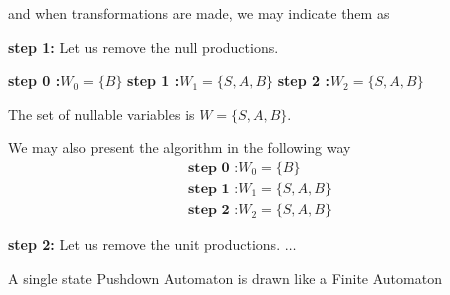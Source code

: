 \documentclass[a4 paper]{article}
\begin{document}
\noindent and when transformations are made, we may indicate them as

\noindent \textbf{step 1: } Let us remove the null productions. 

\begin{center}
\begin{algorithmic}
\STATE \textbf{step 0 :}$W_0=\lbrace B\rbrace$
\STATE  \textbf{step 1 :}$W_1=\lbrace S, A, B\rbrace$
\STATE  \textbf{step 2 :}$W_2=\lbrace S, A, B\rbrace$
\end{algorithmic}
\end{center} 
\noindent The set of nullable variables is $W=\lbrace S, A, B\rbrace$.

We may also present the algorithm in the following way 
\begin{equation*}
    \begin{array}{l}
         \textbf{step 0 :}W_0=\lbrace B\rbrace  \\
         \textbf{step 1 :}W_1=\lbrace S, A, B\rbrace\\ 
         \textbf{step 2 :}W_2=\lbrace S, A, B\rbrace
    \end{array}
\end{equation*}

\noindent \textbf{step 2: } Let us remove the unit productions. $\ldots$

\begin{flushright}
\end{flushright}

\newpage
\vspace{5mm}

A single state Pushdown Automaton is drawn like a Finite Automaton
\begin{center}
\end{center}
 
\end{document}
